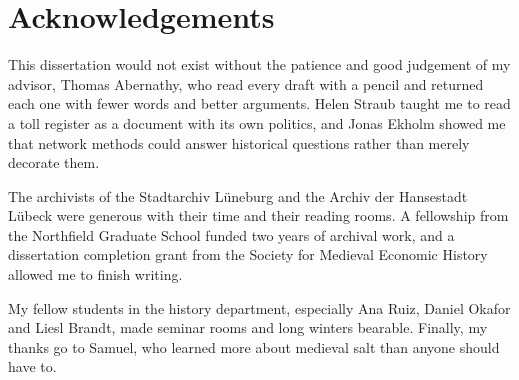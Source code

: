 \chapter*{Acknowledgements}

This dissertation would not exist without the patience and good judgement of my advisor, Thomas Abernathy, who read every draft with a pencil and returned each one with fewer words and better arguments. Helen Straub taught me to read a toll register as a document with its own politics, and Jonas Ekholm showed me that network methods could answer historical questions rather than merely decorate them.

The archivists of the Stadtarchiv Lüneburg and the Archiv der Hansestadt Lübeck were generous with their time and their reading rooms. A fellowship from the Northfield Graduate School funded two years of archival work, and a dissertation completion grant from the Society for Medieval Economic History allowed me to finish writing.

My fellow students in the history department, especially Ana Ruiz, Daniel Okafor and Liesl Brandt, made seminar rooms and long winters bearable. Finally, my thanks go to Samuel, who learned more about medieval salt than anyone should have to.
\clearpage
